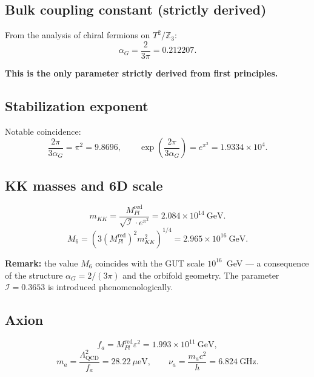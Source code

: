 \documentclass[12pt,a4paper]{article}
\numberwithin{equation}{section}
\begin{document}
\subsection{Bulk coupling constant (strictly derived)}

From the analysis of chiral fermions on $T^2/\mathbb{Z}_3$:
\begin{equation}
\alpha_G = \frac{2}{3\pi} = 0.212207.
\end{equation}

\textbf{This is the only parameter strictly derived from
first principles.}

\subsection{Stabilization exponent}

Notable coincidence:
\begin{equation}
\frac{2\pi}{3\alpha_G} = \pi^2 = 9.8696, \qquad
\exp\left(\frac{2\pi}{3\alpha_G}\right) = e^{\pi^2}
= 1.9334\times 10^4.
\end{equation}

\subsection{KK masses and 6D scale}

\begin{equation}
m_{KK} = \frac{M_{Pl}^{\text{red}}}{\sqrt{\mathcal{I}}
\cdot e^{\pi^2}} = 2.084\times 10^{14}~\text{GeV}.
\end{equation}
\begin{equation}
M_6 = \left(3 (M_{Pl}^{\text{red}})^2 m_{KK}^2\right)^{1/4}
= 2.965\times 10^{16}~\text{GeV}.
\end{equation}

\textbf{Remark:} the value $M_6$ coincides with the GUT scale
$10^{16}$~GeV — a consequence of the structure $\alpha_G = 2/(3\pi)$
and the orbifold geometry. The parameter $\mathcal{I} = 0.3653$
is introduced phenomenologically.

\subsection{Axion}

\begin{equation}
f_a = M_{Pl}^{\text{red}} \varepsilon^2
= 1.993\times 10^{11}~\text{GeV},
\end{equation}
\begin{equation}
m_a = \frac{\Lambda_{\text{QCD}}^2}{f_a} = 28.22~\mu\text{eV},
\qquad \nu_a = \frac{m_a c^2}{h} = 6.824~\text{GHz}.
\end{equation}
\end{document}
